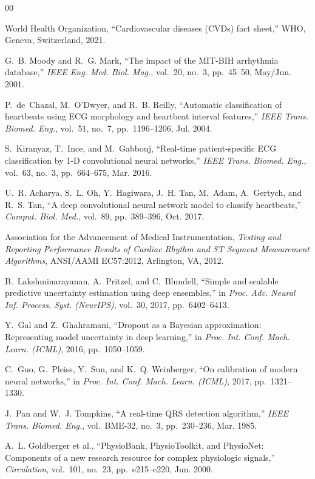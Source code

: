 \documentclass[conference]{IEEEtran}
\begin{document}
\begin{thebibliography}{00}

World Health Organization, ``Cardiovascular diseases (CVDs) fact sheet,'' WHO, Geneva, Switzerland, 2021.

G.~B. Moody and R.~G. Mark, ``The impact of the MIT-BIH arrhythmia database,'' \textit{IEEE Eng. Med. Biol. Mag.}, vol.~20, no.~3, pp.~45--50, May/Jun. 2001.

P.~de~Chazal, M.~O'Dwyer, and R.~B. Reilly, ``Automatic classification of heartbeats using ECG morphology and heartbeat interval features,'' \textit{IEEE Trans. Biomed. Eng.}, vol.~51, no.~7, pp.~1196--1206, Jul. 2004.

S.~Kiranyaz, T.~Ince, and M.~Gabbouj, ``Real-time patient-specific ECG classification by 1-D convolutional neural networks,'' \textit{IEEE Trans. Biomed. Eng.}, vol.~63, no.~3, pp.~664--675, Mar. 2016.

U.~R. Acharya, S.~L. Oh, Y.~Hagiwara, J.~H. Tan, M.~Adam, A.~Gertych, and R.~S. Tan, ``A deep convolutional neural network model to classify heartbeats,'' \textit{Comput. Biol. Med.}, vol.~89, pp.~389--396, Oct. 2017.

Association for the Advancement of Medical Instrumentation, \textit{Testing and Reporting Performance Results of Cardiac Rhythm and ST Segment Measurement Algorithms}, ANSI/AAMI EC57:2012, Arlington, VA, 2012.

B.~Lakshminarayanan, A.~Pritzel, and C.~Blundell, ``Simple and scalable predictive uncertainty estimation using deep ensembles,'' in \textit{Proc. Adv. Neural Inf. Process. Syst. (NeurIPS)}, vol.~30, 2017, pp.~6402--6413.

Y.~Gal and Z.~Ghahramani, ``Dropout as a Bayesian approximation: Representing model uncertainty in deep learning,'' in \textit{Proc. Int. Conf. Mach. Learn. (ICML)}, 2016, pp.~1050--1059.

C.~Guo, G.~Pleiss, Y.~Sun, and K.~Q. Weinberger, ``On calibration of modern neural networks,'' in \textit{Proc. Int. Conf. Mach. Learn. (ICML)}, 2017, pp.~1321--1330.

J.~Pan and W.~J. Tompkins, ``A real-time QRS detection algorithm,'' \textit{IEEE Trans. Biomed. Eng.}, vol.~BME-32, no.~3, pp.~230--236, Mar. 1985.

A.~L. Goldberger et al., ``PhysioBank, PhysioToolkit, and PhysioNet: Components of a new research resource for complex physiologic signals,'' \textit{Circulation}, vol.~101, no.~23, pp.~e215--e220, Jun. 2000.


\end{thebibliography}
\end{document}
